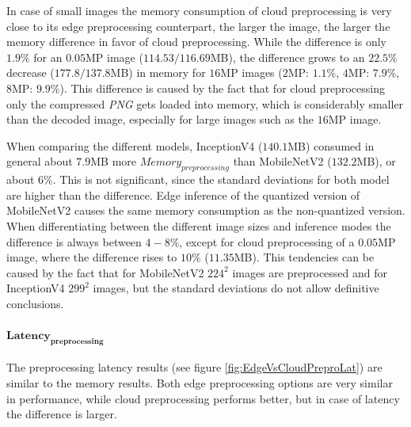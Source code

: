 In case of small images the memory consumption of cloud preprocessing is very close to its edge preprocessing counterpart, the larger the image, the larger the memory difference in favor of cloud preprocessing.
While the difference is only $1.9\%$ for an $0.05$MP image ($114.53/116.69$MB), the difference grows to an $22.5\%$ decrease ($177.8/137.8$MB) in memory for $16$MP images ($2$MP: $1.1\%$, $4$MP: $7.9\%$, $8$MP: $9.9\%$).
This difference is caused by the fact that for cloud preprocessing only the compressed \emph{PNG} gets loaded into memory, which is considerably smaller than the decoded image, especially for large images such as the $16$MP image.

When comparing the different models, InceptionV4 ($140.1$MB) consumed in general about $7.9$MB more $Memory_{preprocessing}$ than MobileNetV2 ($132.2$MB), or about $6\%$. This is not significant, since the standard deviations for both model are higher than the difference.
Edge inference of the quantized version of MobileNetV2 causes the same memory consumption as the non-quantized version.
When differentiating between the different image sizes and inference modes the difference is always between $4-8\%$, except for cloud preprocessing of a $0.05$MP image, where the difference rises to $10\%$ ($11.35$MB). This tendencies can be caused by the fact that for MobileNetV2 $224^2$ images are preprocessed and for InceptionV4 $299^2$ images, but the standard deviations do not allow definitive conclusions.

\paragraph{$\mathbf{Latency_{preprocessing}}$}
The preprocessing latency results (see figure \ref{fig:EdgeVsCloudPreproLat}) are similar to the memory results. Both edge preprocessing options are very similar in performance, while cloud preprocessing performs better, but in case of latency the difference is larger.

